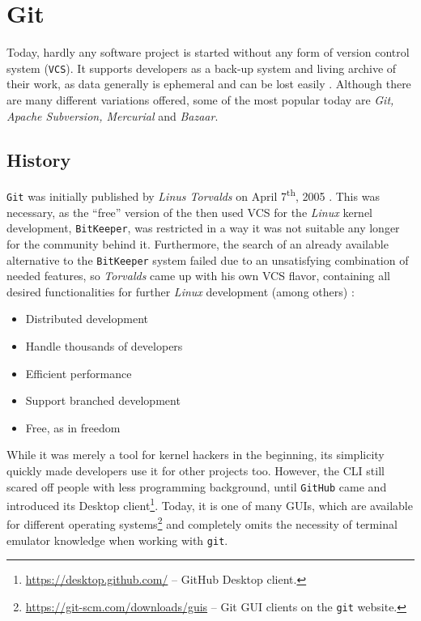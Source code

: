 \section{Git}
\label{sec:git}

Today, hardly any software project is started without any form of version control system (\texttt{VCS}). It supports developers as a back-up system and living archive of their work, as data generally is ephemeral and can be lost easily \cite[1]{loeliger2012version}. Although there are many different variations offered, some of the most popular today are \emph{Git, Apache Subversion, Mercurial} and \emph{Bazaar}.

\subsection{History}
\label{sec:git-history}
\texttt{Git} was initially published by \emph{Linus Torvalds} on April 7\textsuperscript{th}, 2005 \cite[6]{loeliger2012version}. This was necessary, as the ``free'' version of the then used VCS for the \emph{Linux} kernel development, \texttt{BitKeeper}, was restricted in a way it was not suitable any longer for the community behind it. Furthermore, the search of an already available alternative to the \texttt{BitKeeper} system failed due to an unsatisfying combination of needed features, so \emph{Torvalds} came up with his own VCS flavor, containing all desired functionalities for further \emph{Linux} development (among others) \cite[4]{loeliger2012version}:

\begin{itemize}
  \item Distributed development
  \item Handle thousands of developers
  \item Efficient performance
  \item Support branched development
  \item Free, as in freedom
\end{itemize}

While it was merely a tool for kernel hackers in the beginning, its simplicity quickly made developers use it for other projects too. However, the CLI still scared off people with less programming background, until \texttt{GitHub} came and introduced its Desktop client\footnote{\url{https://desktop.github.com/} -- GitHub Desktop client.}. Today, it is one of many GUIs, which are available for different operating systems\footnote{\url{https://git-scm.com/downloads/guis} -- Git GUI clients on the \texttt{git} website.} and completely omits the necessity of terminal emulator knowledge when working with \texttt{git}.

